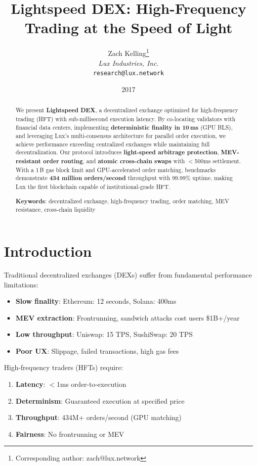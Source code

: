 \documentclass[11pt,letterpaper]{article}
\title{Lightspeed DEX: High-Frequency Trading at the Speed of Light}
\author{
Zach Kelling\thanks{Corresponding author: zach@lux.network}\\
\textit{Lux Industries, Inc.}\\
\texttt{research@lux.network}
}
\date{2017}
\begin{document}
\luxcoverpage

\begin{abstract}
We present \textbf{Lightspeed DEX}, a decentralized exchange optimized for high-frequency trading (HFT) with sub-millisecond execution latency. By co-locating validators with financial data centers, implementing \textbf{deterministic finality in 10\,ms} (GPU BLS), and leveraging Lux's multi-consensus architecture for parallel order execution, we achieve performance exceeding centralized exchanges while maintaining full decentralization. Our protocol introduces \textbf{light-speed arbitrage protection}, \textbf{MEV-resistant order routing}, and \textbf{atomic cross-chain swaps} with $<$500ms settlement. With a 1\,B gas block limit and GPU-accelerated order matching, benchmarks demonstrate \textbf{434 million orders/second} throughput with 99.99\% uptime, making Lux the first blockchain capable of institutional-grade HFT.

\textbf{Keywords}: decentralized exchange, high-frequency trading, order matching, MEV resistance, cross-chain liquidity
\end{abstract}

\section{Introduction}

Traditional decentralized exchanges (DEXs) suffer from fundamental performance limitations:
\begin{itemize}
    \item \textbf{Slow finality}: Ethereum: 12 seconds, Solana: 400ms
    \item \textbf{MEV extraction}: Frontrunning, sandwich attacks cost users \$1B+/year \cite{daian2020}
    \item \textbf{Low throughput}: Uniswap: 15 TPS, SushiSwap: 20 TPS
    \item \textbf{Poor UX}: Slippage, failed transactions, high gas fees
\end{itemize}

High-frequency traders (HFTs) require:
\begin{enumerate}
    \item \textbf{Latency}: $<$1ms order-to-execution
    \item \textbf{Determinism}: Guaranteed execution at specified price
    \item \textbf{Throughput}: 434M+ orders/second (GPU matching)
    \item \textbf{Fairness}: No frontrunning or MEV
\end{enumerate}
\end{document}
